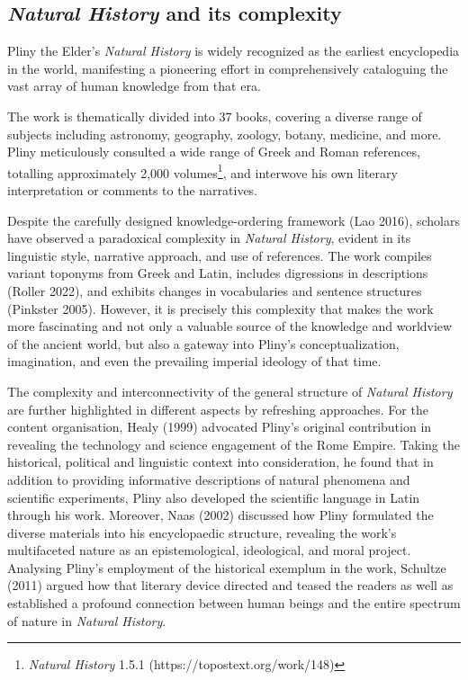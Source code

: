 \documentclass[
  12pt,
]{article}
\begin{document}
\hypertarget{natural-history-and-its-complexity}{%
\subsection{\texorpdfstring{\emph{Natural History} and its
complexity}{Natural History and its complexity}}\label{natural-history-and-its-complexity}}

Pliny the Elder's \emph{Natural History} is widely recognized as the
earliest encyclopedia in the world, manifesting a pioneering effort in
comprehensively cataloguing the vast array of human knowledge from that
era.

The work is thematically divided into 37 books, covering a diverse range
of subjects including astronomy, geography, zoology, botany, medicine,
and more. Pliny meticulously consulted a wide range of Greek and Roman
references, totalling approximately 2,000 volumes\footnote{\emph{Natural
  History} 1.5.1 (https://topostext.org/work/148)}, and interwove his
own literary interpretation or comments to the narratives.

Despite the carefully designed knowledge-ordering framework (Lao 2016),
scholars have observed a paradoxical complexity in \emph{Natural
History}, evident in its linguistic style, narrative approach, and use
of references. The work compiles variant toponyms from Greek and Latin,
includes digressions in descriptions (Roller 2022), and exhibits changes
in vocabularies and sentence structures (Pinkster 2005). However, it is
precisely this complexity that makes the work more fascinating and not
only a valuable source of the knowledge and worldview of the ancient
world, but also a gateway into Pliny's conceptualization, imagination,
and even the prevailing imperial ideology of that time.

The complexity and interconnectivity of the general structure of
\emph{Natural History} are further highlighted in different aspects by
refreshing approaches. For the content organisation, Healy (1999)
advocated Pliny's original contribution in revealing the technology and
science engagement of the Rome Empire. Taking the historical, political
and linguistic context into consideration, he found that in addition to
providing informative descriptions of natural phenomena and scientific
experiments, Pliny also developed the scientific language in Latin
through his work. Moreover, Naas (2002) discussed how Pliny formulated
the diverse materials into his encyclopaedic structure, revealing the
work's multifaceted nature as an epistemological, ideological, and moral
project. Analysing Pliny's employment of the historical exemplum in the
work, Schultze (2011) argued how that literary device directed and
teased the readers as well as established a profound connection between
human beings and the entire spectrum of nature in \emph{Natural
History}.
\end{document}
